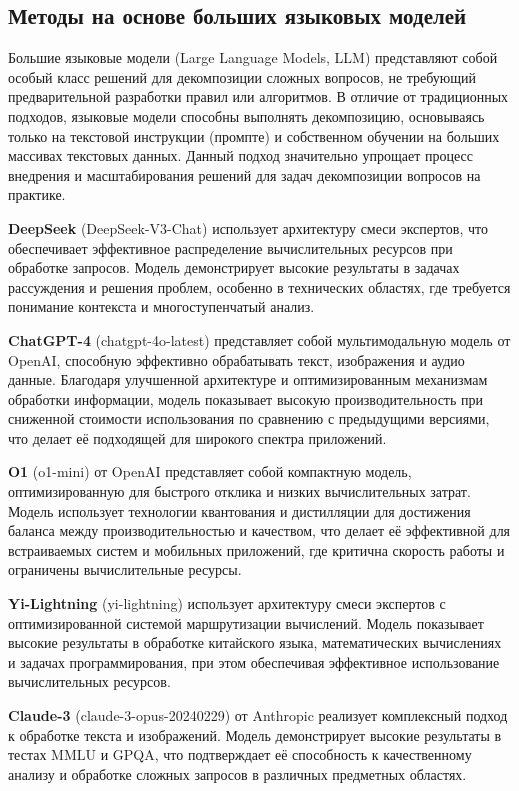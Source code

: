 \subsection{Методы на основе больших языковых моделей}

Большие языковые модели (Large Language Models, LLM) представляют собой особый класс решений для декомпозиции сложных вопросов, не требующий предварительной разработки правил или алгоритмов. В отличие от традиционных подходов, языковые модели способны выполнять декомпозицию, основываясь только на текстовой инструкции (промпте) и собственном обучении на больших массивах текстовых данных. \cite{venktesh2023context} Данный подход значительно упрощает процесс внедрения и масштабирования решений для задач декомпозиции вопросов на практике.

\textbf{DeepSeek} (DeepSeek-V3-Chat) использует архитектуру смеси экспертов, что обеспечивает эффективное распределение вычислительных ресурсов при обработке запросов. Модель демонстрирует высокие результаты в задачах рассуждения и решения проблем, особенно в технических областях, где требуется понимание контекста и многоступенчатый анализ. \cite{deepseek}

\textbf{ChatGPT-4} (chatgpt-4o-latest) представляет собой мультимодальную модель от OpenAI, способную эффективно обрабатывать текст, изображения и аудио данные. Благодаря улучшенной архитектуре и оптимизированным механизмам обработки информации, модель показывает высокую производительность при сниженной стоимости использования по сравнению с предыдущими версиями, что делает её подходящей для широкого спектра приложений. \cite{gpt4}

\textbf{O1} (o1-mini) от OpenAI представляет собой компактную модель, оптимизированную для быстрого отклика и низких вычислительных затрат. Модель использует технологии квантования и дистилляции для достижения баланса между производительностью и качеством, что делает её эффективной для встраиваемых систем и мобильных приложений, где критична скорость работы и ограничены вычислительные ресурсы. \cite{o1}

\textbf{Yi-Lightning} (yi-lightning) использует архитектуру смеси экспертов с оптимизированной системой маршрутизации вычислений. Модель показывает высокие результаты в обработке китайского языка, математических вычислениях и задачах программирования, при этом обеспечивая эффективное использование вычислительных ресурсов. \cite{yi}

\textbf{Claude-3} (claude-3-opus-20240229) от Anthropic реализует комплексный подход к обработке текста и изображений. Модель демонстрирует высокие результаты в тестах MMLU и GPQA, что подтверждает её способность к качественному анализу и обработке сложных запросов в различных предметных областях. \cite{claude}

